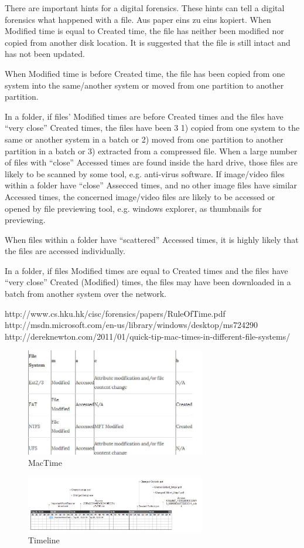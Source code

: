 \newline \newline There are important hints for a digital forensics. These hints can tell a digital forensics what happened with a file. Aus paper eins zu eins kopiert.
When Modified time is equal to Created time, the file has neither been modified nor copied from another disk location. It is suggested that the file is still intact and has not been updated.

When Modified time is before Created time, the file has been copied from one system into the same/another system or moved from one partition to another partition.

In a folder, if files’ Modified times are before Created times and the files have “very close” Created times, the files have been 3
1) copied from one system to the same or another system in a
batch or
2) moved from one partition to another partition in a batch
or
3) extracted from a compressed file.
When a large number of files with “close” Accessed times are found inside the hard drive, those files are likely to be scanned by some tool, e.g. anti-virus software.
If image/video files within a folder have “close” Assecced times, and no other image files have similar Accessed times,
the concerned image/video files are likely to be accessed or opened by file previewing tool, e.g. windows explorer, as
thumbnails for previewing.

When files within a folder have “scattered” Accessed times, it is highly likely that the files are accessed individually.

In a folder, if files Modified times are equal to Created times and the files have “very close” Created (Modified) times, the files may have been downloaded in a batch from another system over the network.

http://www.cs.hku.hk/cisc/forensics/papers/RuleOfTime.pdf
http://msdn.microsoft.com/en-us/library/windows/desktop/ms724290%
http://dereknewton.com/2011/01/quick-tip-mac-times-in-different-file-systems/
\\
\begin{figure}[tbph]
	\centering
	\includegraphics[width=0.7\textwidth]{graphics/mactime}
	\caption{MacTime}
	\label{fig:Mactime}
\end{figure}

\begin{figure}[tbph]
\centering
\includegraphics[width=0.7\textwidth]{graphics/timeline}
\caption{Timeline}
\label{fig:timeline}
\end{figure}
